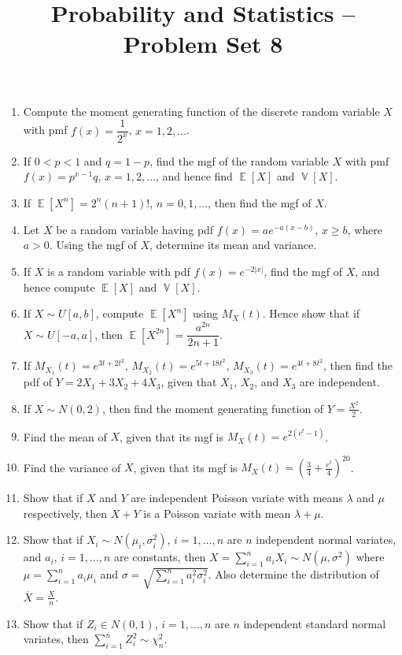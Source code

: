 \documentclass[svgnames]{amsart}
\title[]{Probability and Statistics -- Problem Set 8}
\DeclareMathOperator{\EV}{\mathbb E}
\DeclareMathOperator{\Var}{\mathbb V}
\begin{document}
\maketitle
\begin{enumerate}[leftmargin=*, itemsep=0.3em]
\item Compute the moment generating function of the discrete random variable $X$ with pmf $f(x) = \dfrac{1}{2^x}$, $x = 1, 2, \ldots$.

\item If $0 < p < 1$ and $q = 1 - p$, find the mgf of the random variable $X$ with pmf $f(x) = p^{x - 1} q$, $x = 1, 2, \ldots$, and hence find $\EV[X]$ and $\Var[X]$.

\item If $\EV[X^n] = 2^n (n + 1)!$, $n = 0, 1, \ldots$, then find the mgf of $X$.

\item Let $X$ be a random variable having pdf $f(x) = a e^{-a(x - b)}$, $x \ge b$, where $a > 0$. Using the mgf of $X$, determine its mean and variance.

\item If $X$ is a random variable with pdf $f(x) = e^{-2|x|}$, find the mgf of $X$, and hence compute $\EV[X]$ and $\Var[X]$.

\item If $X \sim U[a, b]$, compute $\EV[X^n]$ using $M_X(t)$. Hence show that if $X \sim U[-a, a]$, then $\EV[X^{2n}] = \dfrac{a^{2n}}{2n + 1}$.

\item If $M_{X_1}(t) = e^{3t + 2t^2}$, $M_{X_2}(t) = e^{5t + 18t^2}$, $M_{X_3}(t) = e^{4t + 8t^2}$, then find the pdf of $Y = 2X_1 + 3X_2 + 4X_3$, given that $X_1$, $X_2$, and $X_3$ are independent.

\item If $X \sim N(0, 2)$, then find the moment generating function of $Y = \frac{X^2}{2}$.

\item Find the mean of $X$, given that its mgf is $M_X(t) = e^{2(e^t - 1)}$.

\item Find the variance of $X$, given that its mgf is $M_X(t) = \left(\frac 3 4 + \frac{e^t}{4}\right)^{20}$.

\item Show that if $X$ and $Y$ are independent Poisson variate with means $\lambda$ and $\mu$ respectively, then $X + Y$ is a Poisson variate with mean $\lambda + \mu$.

\item Show that if $X_i \sim N(\mu_i, \sigma_i^2)$, $i = 1, \ldots, n$ are $n$ independent normal variates, and $a_i$, $i = 1, \ldots, n$ are constants, then $X = \sum_{i=1}^{n} a_i X_i \sim N(\mu, \sigma^2)$ where $\mu = \sum_{i = 1}^{n} a_i \mu_i$ and $\sigma = \sqrt{\sum_{i = 1}^n a_i^2 \sigma_i^2}$. Also determine the distribution of $\overline X = \frac X n$.

\item Show that if $Z_i \in N(0, 1)$, $i = 1, \ldots, n$ are $n$ independent standard normal variates, then $\sum_{i = 1}^n Z_i^2 \sim \chi^2_n$.

\end{enumerate}
\end{document}
